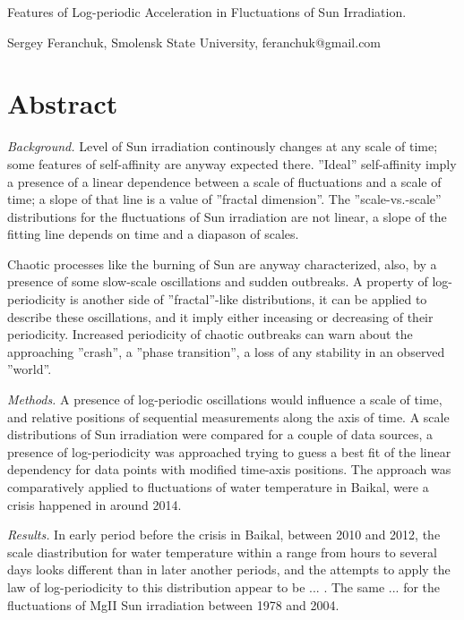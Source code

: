 \documentclass[a4paper]{article}
\begin{document}
\begin{center}
{\large{Features of Log-periodic Acceleration in Fluctuations of Sun Irradiation.}}
\vskip 12pt
\end{center}

Sergey Feranchuk, Smolensk State University, feranchuk@gmail.com

\section*{Abstract}

\textit{Background.} Level of Sun irradiation continously changes at any scale of time; some features of self-affinity are anyway expected there. ''Ideal'' self-affinity imply a presence of a linear dependence between a scale of fluctuations and a scale of time; a slope of that line is a value of ''fractal dimension''. The ''scale-vs.-scale'' distributions for the fluctuations of Sun irradiation are not linear, a slope of the fitting line depends on time and a diapason of scales. 

Chaotic processes like the burning of Sun are anyway characterized, also, by a presence of some slow-scale oscillations and sudden outbreaks. A property of log-periodicity is another side of ''fractal''-like distributions, it can be applied to describe these oscillations, and it imply either inceasing or decreasing of their periodicity. Increased periodicity of chaotic outbreaks can warn about the approaching ''crash'', a ''phase transition'', a loss of any stability in an observed ''world''.

\textit{Methods.}  A presence of log-periodic oscillations would influence a scale of time, and relative positions of sequential measurements along the axis of time.
A scale distributions of Sun irradiation were compared for a couple of data sources, a presence of log-periodicity was approached trying to guess a best fit of the linear dependency for data points with modified time-axis positions. The approach was comparatively applied to fluctuations of water temperature in Baikal, were a crisis happened in around 2014. 

\textit{Results.} In early period before the crisis in Baikal, between 2010 and 2012, the scale diastribution for water temperature within a range from hours to several days looks different than in later another periods, and the attempts to apply the law of log-periodicity to this distribution appear to be ... . The same ... for the fluctuations of MgII Sun irradiation between 1978 and 2004.
\end{document}
